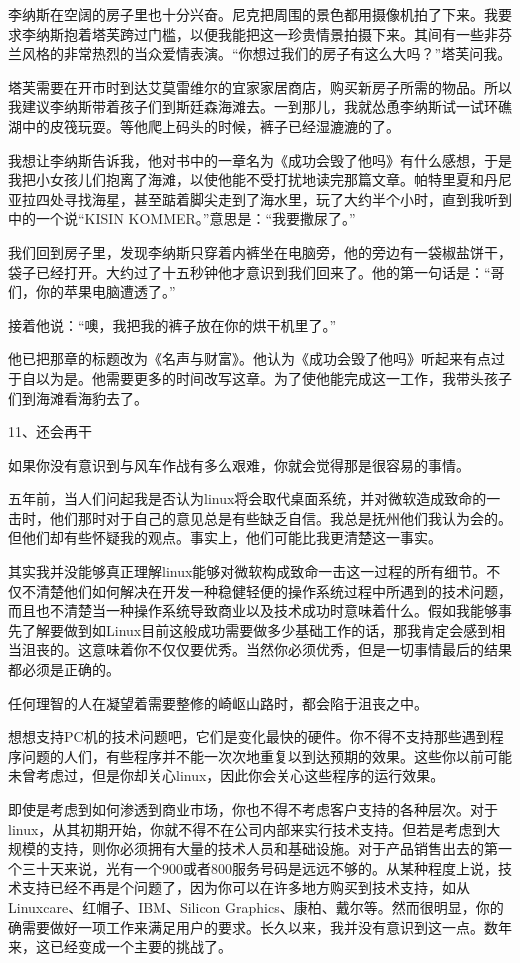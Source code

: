 李纳斯在空阔的房子里也十分兴奋。尼克把周围的景色都用摄像机拍了下来。我要求李纳斯抱着塔芙跨过门槛，以便我能把这一珍贵情景拍摄下来。其间有一些非芬兰风格的非常热烈的当众爱情表演。“你想过我们的房子有这么大吗？”塔芙问我。

塔芙需要在开市时到达艾莫雷维尔的宜家家居商店，购买新房子所需的物品。所以我建议李纳斯带着孩子们到斯廷森海滩去。一到那儿，我就怂恿李纳斯试一试环礁湖中的皮筏玩耍。等他爬上码头的时候，裤子已经湿漉漉的了。

我想让李纳斯告诉我，他对书中的一章名为《成功会毁了他吗》有什么感想，于是我把小女孩儿们抱离了海滩，以使他能不受打扰地读完那篇文章。帕特里夏和丹尼亚拉四处寻找海星，甚至踮着脚尖走到了海水里，玩了大约半个小时，直到我听到中的一个说“KISIN KOMMER。”意思是：“我要撒尿了。”

我们回到房子里，发现李纳斯只穿着内裤坐在电脑旁，他的旁边有一袋椒盐饼干，袋子已经打开。大约过了十五秒钟他才意识到我们回来了。他的第一句话是：“哥们，你的苹果电脑遭透了。”

接着他说：“噢，我把我的裤子放在你的烘干机里了。”

他已把那章的标题改为《名声与财富》。他认为《成功会毁了他吗》听起来有点过于自以为是。他需要更多的时间改写这章。为了使他能完成这一工作，我带头孩子们到海滩看海豹去了。

 
11、还会再干

如果你没有意识到与风车作战有多么艰难，你就会觉得那是很容易的事情。

五年前，当人们问起我是否认为linux将会取代桌面系统，并对微软造成致命的一击时，他们那时对于自己的意见总是有些缺乏自信。我总是抚州他们我认为会的。但他们却有些怀疑我的观点。事实上，他们可能比我更清楚这一事实。

其实我并没能够真正理解linux能够对微软构成致命一击这一过程的所有细节。不仅不清楚他们如何解决在开发一种稳健轻便的操作系统过程中所遇到的技术问题，而且也不清楚当一种操作系统导致商业以及技术成功时意味着什么。假如我能够事先了解要做到如Linux目前这般成功需要做多少基础工作的话，那我肯定会感到相当沮丧的。这意味着你不仅仅要优秀。当然你必须优秀，但是一切事情最后的结果都必须是正确的。

任何理智的人在凝望着需要整修的崎岖山路时，都会陷于沮丧之中。

想想支持PC机的技术问题吧，它们是变化最快的硬件。你不得不支持那些遇到程序问题的人们，有些程序并不能一次次地重复以到达预期的效果。这些你以前可能未曾考虑过，但是你却关心linux，因此你会关心这些程序的运行效果。

即使是考虑到如何渗透到商业市场，你也不得不考虑客户支持的各种层次。对于linux，从其初期开始，你就不得不在公司内部来实行技术支持。但若是考虑到大规模的支持，则你必须拥有大量的技术人员和基础设施。对于产品销售出去的第一个三十天来说，光有一个900或者800服务号码是远远不够的。从某种程度上说，技术支持已经不再是个问题了，因为你可以在许多地方购买到技术支持，如从Linuxcare、红帽子、IBM、Silicon Graphics、康柏、戴尔等。然而很明显，你的确需要做好一项工作来满足用户的要求。长久以来，我并没有意识到这一点。数年来，这已经变成一个主要的挑战了。

